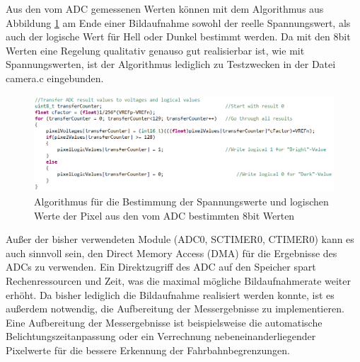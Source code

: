 
Aus den vom ADC gemessenen Werten können mit dem Algorithmus aus Abbildung \ref{fig:PixelCalc} am Ende einer Bildaufnahme sowohl der reelle Spannungswert, als auch der logische Wert für Hell oder Dunkel bestimmt werden. Da mit den 8bit Werten eine Regelung qualitativ genauso gut realisierbar ist, wie mit Spannungswerten, ist der Algorithmus lediglich zu Testzwecken in der Datei \glqq{}camera.c\grqq{} eingebunden.

\begin{figure}[H] %
\includegraphics[width=.95\textwidth]{sec7/images/code/PixelCalc} 
\centering
\captionsetup{width=.95\textwidth}
\caption[Algorithmus für die Bestimmung der Spannungswerte und logischen Werte der Pixel]{Algorithmus für die Bestimmung der Spannungswerte und logischen Werte der Pixel aus den vom ADC bestimmten 8bit Werten}\centering
\label{fig:PixelCalc}
\end{figure}

Außer der bisher verwendeten Module (ADC0, SCTIMER0, CTIMER0) kann es auch sinnvoll sein, den Direct Memory Access (DMA) für die Ergebnisse des ADCs zu verwenden. Ein Direktzugriff des ADC auf den Speicher spart Rechenressourcen und Zeit, was die maximal mögliche Bildaufnahmerate weiter erhöht. Da bisher lediglich die Bildaufnahme realisiert werden konnte, ist es außerdem notwendig, die Aufbereitung der Messergebnisse zu implementieren. Eine Aufbereitung der Messergebnisse ist beispielsweise die automatische Belichtungszeitanpassung oder ein Verrechnung nebeneinanderliegender Pixelwerte für die bessere Erkennung der Fahrbahnbegrenzungen.





\newpage